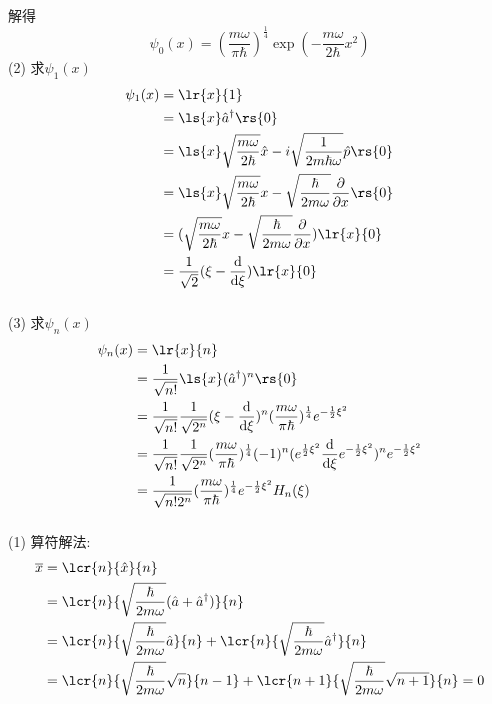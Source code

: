 \begin{frame}
    \frametitle{}
    解得 \[ 
      \psi_0 (x)=  (\frac{m \omega }{\pi  \hbar})^{\frac{1}{4}}  \exp(- \frac{m \omega }{2 \hbar} x^2) \]
    (2) 求$\psi_1 (x)$
    \[ 
      \begin{aligned}
        \psi_1 (x) &= \lr{x}{1}  \\ 
        &=  \ls{x} \hat{a}^\dagger \rs{0}   \\ 
        &= \ls{x} \sqrt{\frac{m\omega}{2\hbar}}\hat{x} - i \sqrt{\frac{1}{2 m \hbar \omega}} \hat{p} \rs{0}  \\ 
        &= \ls{x} \sqrt{\frac{m\omega}{2\hbar}} x - \sqrt{\frac{\hbar}{2 m \omega}} \frac{\partial }{\partial x } \rs{0}  \\ 
        &= (\sqrt{\frac{m\omega}{2\hbar}} x - \sqrt{\frac{\hbar}{2 m \omega}} \frac{\partial }{\partial x } )\lr{x}{0}  \\ 
        &= \frac{1}{\sqrt{2}} (\xi - \frac{\mathrm{d}}{\mathrm{d}\xi}) \lr{x}{0} 
      \end{aligned} \] 
\end{frame}

\begin{frame}
    \frametitle{}
    (3) 求$\psi_n (x)$
    \[ 
      \begin{aligned}
        \psi_n (x) &= \lr{x}{n}  \\ 
        &=  \frac{1}{\sqrt{n!}}\ls{x} (\hat{a}^\dagger)^n \rs{0}   \\ 
        &=  \frac{1}{\sqrt{n!}}  \frac{1}{\sqrt{2^n}} (\xi - \frac{\mathrm{d} }{\mathrm{d}\xi} )^n (\frac{m \omega }{\pi  \hbar})^{\frac{1}{4}}  e^{- \frac{1 }{2 } \xi^2}    \\ 
        &=  \frac{1}{\sqrt{n!}}  \frac{1}{\sqrt{2^n}} (\frac{m \omega }{\pi  \hbar})^{\frac{1}{4}} (-1)^n (  e ^{\frac{1}{2}\xi^2} \frac{\mathrm{d} }{\mathrm{d}\xi} e ^{-\frac{1}{2}\xi^2})^n  e^{- \frac{1 }{2 } \xi^2}  \\  
        &= \frac{1}{\sqrt{n!2^n}} (\frac{m \omega }{\pi  \hbar})^{\frac{1}{4}} e^{- \frac{1 }{2 } \xi^2} H_n(\xi)  
      \end{aligned} \] 
\end{frame}

\begin{frame}
    \frametitle{}
    \例 [13. 求量子谐振子在真空态下的位置和动量的量子涨落]{\[ \Delta x \Delta p_x =\frac{\hbar}{2} \]}
    \解 (1) 算符解法: 
    \[\begin{aligned}
       \overline{x} & = \lcr{n}{\hat{x}}{n} \\ 
       &=  \lcr{n}{ \sqrt{\frac{\hbar}{2m\omega}} (\hat{a}+ \hat{a}^\dagger)}{n} \\ 
       &=  \lcr{n}{ \sqrt{\frac{\hbar}{2m\omega}} \hat{a}}{n} + \lcr{n}{ \sqrt{\frac{\hbar}{2m\omega}} \hat{a}^\dagger}{n}  \\ 
       &=  \lcr{n}{ \sqrt{\frac{\hbar}{2m\omega}} \sqrt{n}}{n-1} + \lcr{n+1}{ \sqrt{\frac{\hbar}{2m\omega}} \sqrt{n+1} }{n} =0  \\
   \end{aligned} \]     
   \end{frame}
   
